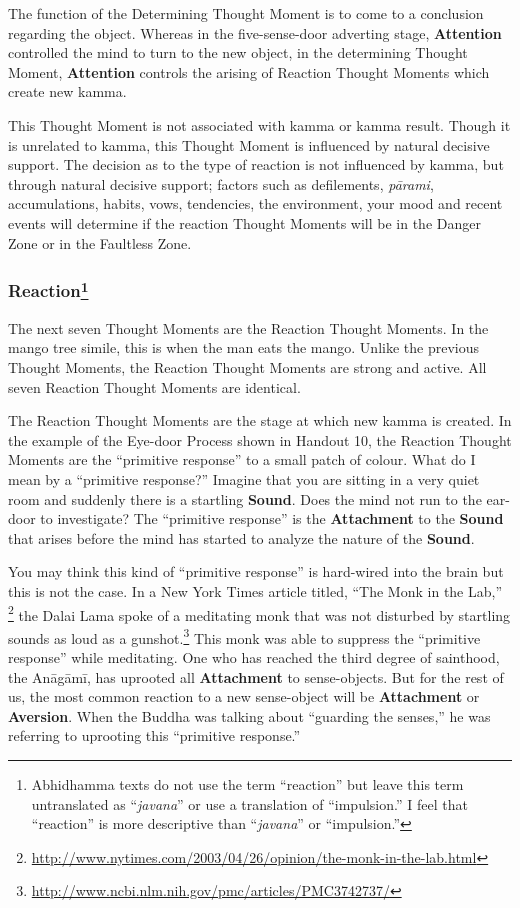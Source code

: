 The function of the Determining Thought Moment is to come to a conclusion regarding the object. Whereas in the five-sense-door adverting stage, \textbf{Attention} controlled the mind to turn to the new object, in the determining Thought Moment, \textbf{Attention} controls the arising of Reaction Thought Moments which create new kamma.

This Thought Moment is not associated with kamma or kamma result. Though it is unrelated to kamma, this Thought Moment is influenced by natural decisive support. The decision as to the type of reaction is not influenced by kamma, but through natural decisive support; factors such as defilements, \textit{pārami}, accumulations, habits, vows, tendencies, the environment, your mood and recent events will determine if the reaction Thought Moments will be in the Danger Zone or in the Faultless Zone.

\subsubsection*{Reaction\footnote{Abhidhamma texts do not use the term “reaction” but leave this term untranslated as “\textit{javana}” or use a translation of “impulsion.” I feel that “reaction” is more descriptive than “\textit{javana}” or “impulsion.”}}

The next seven Thought Moments are the Reaction Thought Moments. In the mango tree simile, this is when the man eats the mango. Unlike the previous Thought Moments, the Reaction Thought Moments are strong and active. All seven Reaction Thought Moments are identical.

The Reaction Thought Moments are the stage at which new kamma is created. In the example of the Eye-door Process shown in Handout 10, the Reaction Thought Moments are the “primitive response” to a small patch of colour. What do I mean by a “primitive response?” Imagine that you are sitting in a very quiet room and suddenly there is a startling \textbf{Sound}. Does the mind not run to the ear-door to investigate? The “primitive response” is the \textbf{Attachment} to the \textbf{Sound} that arises before the mind has started to analyze the nature of the \textbf{Sound}.

You may think this kind of “primitive response” is hard-wired into the brain but this is not the case. In a New York Times article titled, “The Monk in the Lab,” \footnote{\url{http://www.nytimes.com/2003/04/26/opinion/the-monk-in-the-lab.html}} the Dalai Lama spoke of a meditating monk that was not disturbed by startling sounds as loud as a gunshot.\footnote{\url{http://www.ncbi.nlm.nih.gov/pmc/articles/PMC3742737/}} This monk was able to suppress the “primitive response” while meditating. One who has reached the third degree of sainthood, the Anāgāmī, has uprooted all \textbf{Attachment} to sense-objects. But for the rest of us, the most common reaction to a new sense-object will be \textbf{Attachment} or \textbf{Aversion}. When the Buddha was talking about “guarding the senses,” he was referring to uprooting this “primitive response.”

